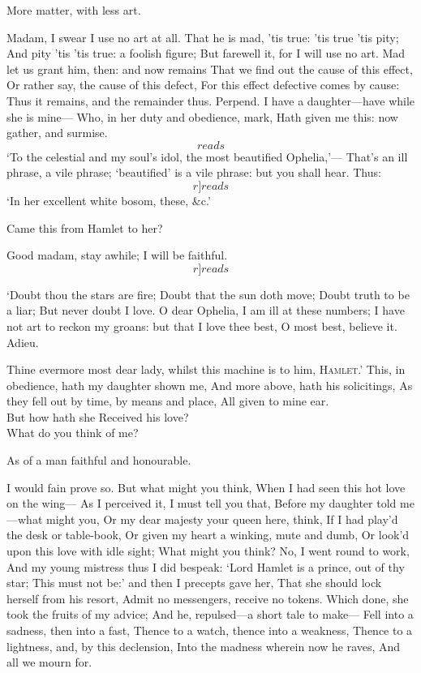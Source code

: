 \documentclass[11pt]{book}
\newenvironment {song}[1][0]
 {\Versus 
  \Locus \textus {+7em+#1em} 
  \Forma \strophae {01}
 }
 {\endVersus}
\begin{document}
\3	                  More matter, with less art.

\5	Madam, I swear I use no art at all.
	That he is mad, 'tis true: 'tis true 'tis pity;
	And pity 'tis 'tis true: a foolish figure;
	But farewell it, for I will use no art.
	Mad let us grant him, then: and now remains
	That we find out the cause of this effect,
	Or rather say, the cause of this defect,
	For this effect defective comes by cause:
	Thus it remains, and the remainder thus.
   Perpend.
	I have a daughter---have while she is mine---
	Who, in her duty and obedience, mark,
	Hath given me this: now gather, and surmise.
	\[reads\] `To the celestial and my soul's idol, the most
	beautified Ophelia,'---
	That's an ill phrase, a vile phrase; `beautified' is
	a vile phrase: but you shall hear. Thus: 	\[r]reads\]
	`In her excellent white bosom, these, \&c.'

\3	Came this from Hamlet to her?

\5	Good madam, stay awhile; I will be faithful. \[r]reads\]
\begin{song}[-3]
  `Doubt thou the stars are fire;
	Doubt that the sun doth move;
	Doubt truth to be a liar;
	But never doubt I love.
\end{song}
	O dear Ophelia, I am ill at these numbers;
	I have not art to reckon my groans: but that
	I love thee best, O most best, believe it. Adieu.
\begin{song}[-3]
	Thine evermore most dear lady, whilst
	this machine is to him, \textsc{Hamlet}.'
\end{song}
	This, in obedience, hath my daughter shown me,
	And more above, hath his solicitings,
	As they fell out by time, by means and place,
	All given to mine ear. \\

\2	But how hath she
	Received his love? \\

\5	                  What do you think of me?

\2	As of a man faithful and honourable.

\5	I would fain prove so. But what might you think,
	When I had seen this hot love on the wing---
	As I perceived it, I must tell you that,
	Before my daughter told me---what might you,
	Or my dear majesty your queen here, think,
	If I had play'd the desk or table-book,
	Or given my heart a winking, mute and dumb,
	Or look'd upon this love with idle sight;
	What might you think? No, I went round to work,
	And my young mistress thus I did bespeak:
	`Lord Hamlet is a prince, out of thy star;
	This must not be:' and then I precepts gave her,
	That she should lock herself from his resort,
	Admit no messengers, receive no tokens.
	Which done, she took the fruits of my advice;
	And he, repulsed---a short tale to make---
	Fell into a sadness, then into a fast,
	Thence to a watch, thence into a weakness,
	Thence to a lightness, and, by this declension,
	Into the madness wherein now he raves,
	And all we mourn for. \\
\end{document}
